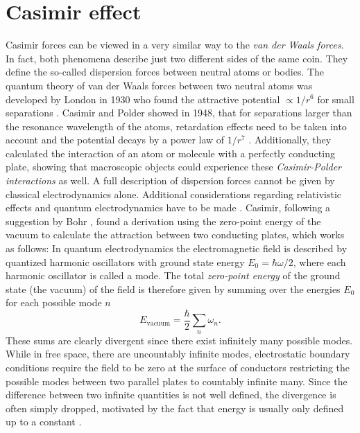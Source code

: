\chapter{Casimir effect}\label{cha:casimir-effect}

Casimir forces can be viewed in a very similar way to the \textit{van der Waals forces}. In fact, both phenomena describe just two different sides of the same coin. They define the so-called dispersion forces between neutral atoms or bodies.
The quantum theory of van der Waals forces between two neutral atoms was developed by London in 1930 who found the attractive potential $\propto 1/r^6$ for small separations \cite{London_1930}.
Casimir and Polder showed in 1948, that for separations larger than the resonance wavelength of the atoms, retardation effects need to be taken into account and the potential decays by a power law of $1/r^7$ \cite{Casimir_1948a}. 
Additionally, they calculated the interaction of an atom or molecule with a perfectly conducting plate, showing that macroscopic objects could experience these \emph{Casimir-Polder interactions} as well.
A full description of dispersion forces cannot be given by classical electrodynamics alone. Additional considerations regarding relativistic effects and quantum electrodynamics have to be made \cite{Bordag_2001,Klimchitskaya_2009,Lamoreaux_2004}.
Casimir, following a suggestion by Bohr \cite{Bordag_1999}, found a derivation using the zero-point energy of the vacuum to calculate the attraction between two conducting plates, which works as follows:
In quantum electrodynamics the electromagnetic field is described by quantized harmonic oscillators with ground state energy $E_0 = \hbar\omega/2$, where each harmonic oscillator is called a mode.
The total \textit{zero-point energy} of the ground state (the vacuum) of the field is therefore given by summing over the energies $E_0$ for each possible mode $n$
\begin{equation}
  E_\mathrm{vacuum} = \frac{\hbar}{2} \sum_n \omega_n.
\end{equation} 
These sums are clearly divergent since there exist infinitely many possible modes.
While in free space, there are uncountably infinite modes, electrostatic boundary conditions require the field to be zero at the surface of conductors restricting the possible modes between two parallel plates to countably infinite many.
Since the difference between two infinite quantities is not well defined, the divergence is often simply dropped, motivated by the fact that energy is usually only defined up to a constant \cite{Bordag_2001}.
